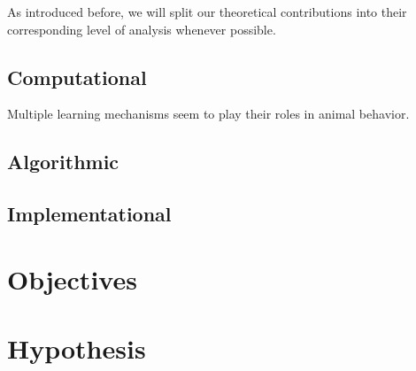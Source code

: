 As introduced before, we will split our theoretical contributions into their corresponding level of analysis whenever possible. 
    \subsection{Computational}
        Multiple learning mechanisms seem to play their roles in animal behavior. 
    \subsection{Algorithmic}
    \subsection{Implementational}
        
\section{Objectives}

\section{Hypothesis}